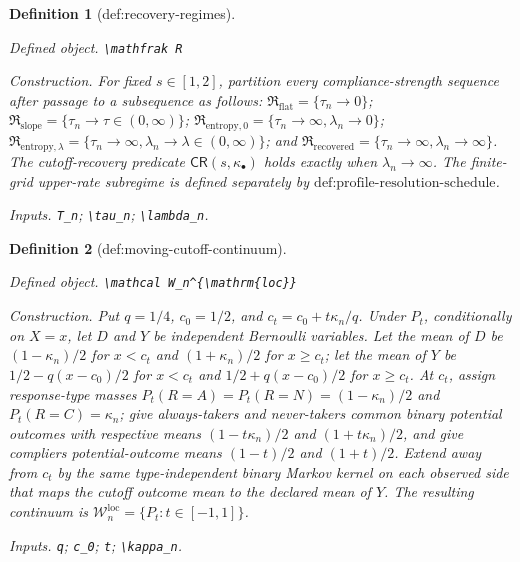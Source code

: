 \documentclass{article}
\newtheorem{definition}{Definition}
\begin{document}
\begin{definition}[def:recovery-regimes]\label{def:recovery-regimes}
\par\smallskip\noindent\emph{Defined object.} \texttt{\textbackslash{}\allowbreak{}mathfrak R}
\par\smallskip\noindent\emph{Construction.} For fixed \(s\in[1,2]\), partition every compliance-strength sequence after passage to a subsequence as follows: \(\mathfrak R_{\mathrm{flat}}=\{\tau_n\to0\}\); \(\mathfrak R_{\mathrm{slope}}=\{\tau_n\to\tau\in(0,\infty)\}\); \(\mathfrak R_{\mathrm{entropy},0}=\{\tau_n\to\infty,\lambda_n\to0\}\); \(\mathfrak R_{\mathrm{entropy},\lambda}=\{\tau_n\to\infty,\lambda_n\to\lambda\in(0,\infty)\}\); and \(\mathfrak R_{\mathrm{recovered}}=\{\tau_n\to\infty,\lambda_n\to\infty\}\). The cutoff-recovery predicate \(\mathsf{CR}(s,\kappa_\bullet)\) holds exactly when \(\lambda_n\to\infty\). The finite-grid upper-rate subregime is defined separately by \(\text{def:profile-resolution-schedule}\).
\par\smallskip\noindent\emph{Inputs.} \texttt{T\_\allowbreak{}n}; \texttt{\textbackslash{}\allowbreak{}tau\_\allowbreak{}n}; \texttt{\textbackslash{}\allowbreak{}lambda\_\allowbreak{}n}.
\end{definition}

\begin{definition}[def:moving-cutoff-continuum]\label{def:moving-cutoff-continuum}
\par\smallskip\noindent\emph{Defined object.} \texttt{\textbackslash{}\allowbreak{}mathcal W\_\allowbreak{}n\textasciicircum{}\{\textbackslash{}\allowbreak{}mathrm\{loc\}\allowbreak{}\}\allowbreak{}}
\par\smallskip\noindent\emph{Construction.} Put \(q=1/4\), \(c_0=1/2\), and \(c_t=c_0+t\kappa_n/q\). Under \(P_t\), conditionally on \(X=x\), let \(D\) and \(Y\) be independent Bernoulli variables. Let the mean of \(D\) be \((1-\kappa_n)/2\) for \(x<c_t\) and \((1+\kappa_n)/2\) for \(x\ge c_t\); let the mean of \(Y\) be \(1/2-q(x-c_0)/2\) for \(x<c_t\) and \(1/2+q(x-c_0)/2\) for \(x\ge c_t\). At \(c_t\), assign response-type masses \(P_t(R=A)=P_t(R=N)=(1-\kappa_n)/2\) and \(P_t(R=C)=\kappa_n\); give always-takers and never-takers common binary potential outcomes with respective means \((1-t\kappa_n)/2\) and \((1+t\kappa_n)/2\), and give compliers potential-outcome means \((1-t)/2\) and \((1+t)/2\). Extend away from \(c_t\) by the same type-independent binary Markov kernel on each observed side that maps the cutoff outcome mean to the declared mean of \(Y\). The resulting continuum is \(\mathcal W_n^{\mathrm{loc}}=\{P_t:t\in[-1,1]\}\).
\par\smallskip\noindent\emph{Inputs.} \texttt{q}; \texttt{c\_\allowbreak{}0}; \texttt{t}; \texttt{\textbackslash{}\allowbreak{}kappa\_\allowbreak{}n}.
\end{definition}
\end{document}
